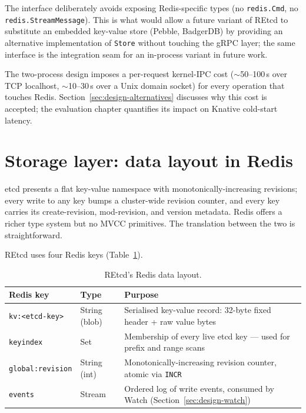 The interface deliberately avoids exposing Redis-specific types (no \texttt{redis.Cmd}, no \texttt{redis.StreamMessage}). This is what would allow a future variant of REtcd to substitute an embedded key-value store (Pebble, BadgerDB) by providing an alternative implementation of \texttt{Store} without touching the gRPC layer; the same interface is the integration seam for an in-process variant in future work.

The two-process design imposes a per-request kernel-IPC cost ($\sim$50--100\,\textmu{}s over TCP localhost, $\sim$10--30\,\textmu{}s over a Unix domain socket) for every operation that touches Redis. Section~\ref{sec:design-alternatives} discusses why this cost is accepted; the evaluation chapter quantifies its impact on Knative cold-start latency.

\section{Storage layer: data layout in Redis}
\label{sec:design-storage}

etcd presents a flat key-value namespace with monotonically-increasing revisions; every write to any key bumps a cluster-wide revision counter, and every key carries its create-revision, mod-revision, and version metadata. Redis offers a richer type system but no MVCC primitives. The translation between the two is straightforward.

REtcd uses four Redis keys (Table~\ref{tab:redis-layout}).

\begin{table}[h]
    \centering
    \caption{REtcd's Redis data layout.}
    \label{tab:redis-layout}
    \begin{tabular}{@{}lll@{}}
        \toprule
        \textbf{Redis key} & \textbf{Type} & \textbf{Purpose} \\
        \midrule
        \texttt{kv:<etcd-key>}    & String (blob) & Serialised key-value record: 32-byte fixed header + raw value bytes \\
        \texttt{keyindex}         & Set           & Membership of every live etcd key --- used for prefix and range scans \\
        \texttt{global:revision}  & String (int)  & Monotonically-increasing revision counter, atomic via \texttt{INCR} \\
        \texttt{events}           & Stream        & Ordered log of write events, consumed by Watch (Section~\ref{sec:design-watch}) \\
        \bottomrule
    \end{tabular}
\end{table}


